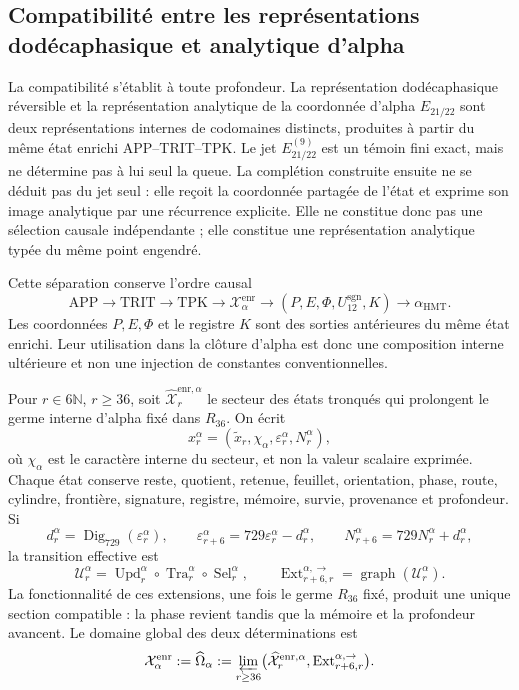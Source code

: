 \subsection{Compatibilité entre les représentations dodécaphasique et analytique d'alpha}
\label{subsec:alpha-publicaciones-completas}

La compatibilité s'établit à toute profondeur. La représentation
dodécaphasique réversible et la représentation analytique de la
coordonnée d'alpha
\(E_{21/22}\) sont deux représentations internes de codomaines distincts,
produites à partir du même état enrichi APP--TRIT--TPK. Le jet
\(E_{21/22}^{(9)}\) est un témoin fini exact, mais ne détermine pas à lui seul
la queue. La complétion construite ensuite ne se déduit pas du jet
seul : elle reçoit la coordonnée partagée de l'état et exprime son image
analytique par une récurrence explicite. Elle ne constitue donc pas une
sélection causale indépendante ; elle constitue une représentation analytique
typée du même point engendré.

Cette séparation conserve l'ordre causal
\[
 \mathrm{APP}\longrightarrow\mathrm{TRIT}\longrightarrow\mathrm{TPK}
 \longrightarrow\mathcal X_{\alpha}^{\mathrm{enr}}
 \longrightarrow (P,E,\Phi,U_{12}^{\mathrm{sgn}},K)
 \longrightarrow\alpha_{\mathrm{HMT}}.
\]
Les coordonnées \(P,E,\Phi\) et le registre \(K\) sont des sorties antérieures du
même état enrichi. Leur utilisation dans la clôture d'alpha est donc une
composition interne ultérieure et non une injection de constantes
conventionnelles.

Pour \(r\in6\mathbb N\), \(r\ge36\), soit
\(\widehat{\mathcal X}^{\mathrm{enr},\alpha}_r\) le secteur des états
tronqués qui prolongent le germe interne d'alpha fixé dans \(R_{36}\). On
écrit
\[
 x_r^\alpha=(\widetilde x_r,\chi_\alpha,
              \varepsilon_r^\alpha,N_r^\alpha),
\]
où \(\chi_\alpha\) est le caractère interne du secteur, et non la valeur scalaire
exprimée. Chaque état conserve reste, quotient, retenue, feuillet, orientation,
phase, route, cylindre, frontière, signature, registre, mémoire, survie,
provenance et profondeur. Si
\[
 d_r^\alpha=\operatorname{Dig}_{729}(\varepsilon_r^\alpha),\qquad
 \varepsilon_{r+6}^\alpha=729\varepsilon_r^\alpha-d_r^\alpha,
 \qquad N_{r+6}^\alpha=729N_r^\alpha+d_r^\alpha,
\]
la transition effective est
\[
 \mathcal U_r^\alpha=
 \operatorname{Upd}_r^\alpha\circ
 \operatorname{Tra}_r^\alpha\circ
 \operatorname{Sel}_r^\alpha,
 \qquad
 \operatorname{Ext}^{\alpha,\to}_{r+6,r}
 =\operatorname{graph}(\mathcal U_r^\alpha).
\]
La fonctionnalité de ces extensions, une fois le germe \(R_{36}\) fixé,
produit une unique section compatible : la phase revient tandis que la mémoire et
la profondeur avancent. Le domaine global des deux déterminations est
\begin{equation}
 \mathcal X_\alpha^{\mathrm{enr}}:=\widehat\Omega_\alpha
 :=\varprojlim_{r\ge36}
 \bigl(\widehat{\mathcal X}^{\mathrm{enr},\alpha}_r,
       \operatorname{Ext}^{\alpha,\to}_{r+6,r}\bigr).
 \label{eq:alpha-dominio-enriquecido-completo}
\end{equation}

